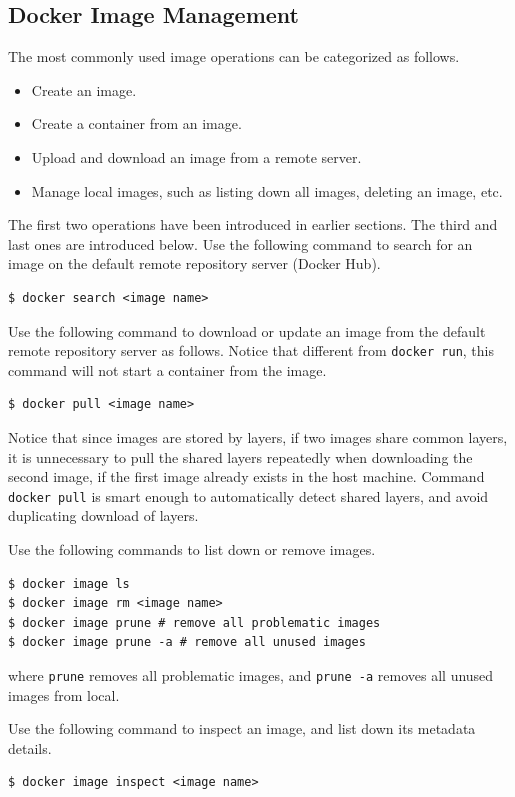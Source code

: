 \subsection{Docker Image Management}

The most commonly used image operations can be categorized as follows.
\begin{itemize}
  \item Create an image.
  \item Create a container from an image.
  \item Upload and download an image from a remote server.
  \item Manage local images, such as listing down all images, deleting an image, etc.
\end{itemize}

The first two operations have been introduced in earlier sections. The third and last ones are introduced below. Use the following command to search for an image on the default remote repository server (Docker Hub).
\begin{lstlisting}
$ docker search <image name>
\end{lstlisting}
Use the following command to download or update an image from the default remote repository server as follows. Notice that different from \verb|docker run|, this command will not start a container from the image.
\begin{lstlisting}
$ docker pull <image name>
\end{lstlisting}
Notice that since images are stored by layers, if two images share common layers, it is unnecessary to pull the shared layers repeatedly when downloading the second image, if the first image already exists in the host machine. Command \verb|docker pull| is smart enough to automatically detect shared layers, and avoid duplicating download of layers.

Use the following commands to list down or remove images.
\begin{lstlisting}
$ docker image ls
$ docker image rm <image name>
$ docker image prune # remove all problematic images
$ docker image prune -a # remove all unused images
\end{lstlisting}
where \verb|prune| removes all problematic images, and \verb|prune -a| removes all unused images from local.

Use the following command to inspect an image, and list down its metadata details.
\begin{lstlisting}
$ docker image inspect <image name>
\end{lstlisting}


